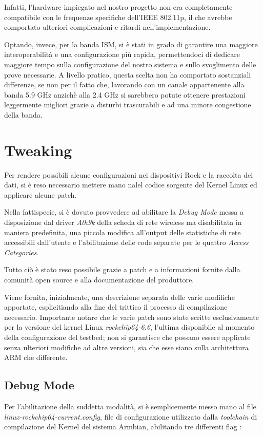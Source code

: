 Infatti, l'hardware impiegato nel nostro progetto non era completamente compatibile con le frequenze specifiche dell'IEEE 802.11p, il che avrebbe comportato ulteriori complicazioni e ritardi nell'implementazione.

Optando, invece, per la banda ISM, si è stati in grado di garantire una maggiore interoperabilità e una configurazione più rapida, permettendoci di dedicare maggiore tempo sulla configurazione del nostro sistema e sullo svoglimento delle prove necessarie. A livello pratico, questa scelta non ha comportato sostanziali differenze, se non per il fatto che, lavorando con un canale appartenente alla banda 5.9 GHz anzichè alla 2.4 GHz si sarebbero potute ottenere prestazioni leggermente migliori grazie a disturbi trascurabili e ad una minore congestione della banda.

\section{Tweaking}
Per rendere possibili alcune configurazioni nei dispositivi Rock e la raccolta dei dati, si è reso necessario mettere mano nalel codice sorgente del Kernel Linux ed applicare alcune patch.

Nella fattispecie, si è dovuto provvedere ad abilitare la \textit{Debug Mode} messa a disposizione dal driver \textit{Ath9k} della scheda di rete wireless ma disabilitata in maniera predefinita, una piccola modifica all'output delle statistiche di rete accessibili dall'utente e l'abilitazione delle code separate per le quattro \textit{Access Categories}.

Tutto ciò è stato reso possibile grazie a patch e a informazioni fornite dalla comunità open source e alla documentazione del produttore.

Viene fornita, inizialmente, una descrizione separata delle varie modifiche apportate, esplicitiando alla fine del trittico il processo di compilazione necessario. Importante notare che le varie patch sono state scritte esclusivamente per la versione del kernel Linux \textit{rockchip64-6.6}, l'ultima disponibile al momento della configurazione del testbed; non si garantisce che possano essere applicate senza ulteriori modifiche ad altre versioni, sia che esse siano sulla architettura ARM che differente.

\subsection[Debug Mode]{Debug Mode}
Per l'abilitazione della suddetta modalità, si è semplicemente messo mano al file \textit{linux-rockchip64-current.config}, file di configurazione utilizzato dalla \textit{toolchain} di compilazione del Kernel del sistema Armbian, abilitando tre differenti flag \cite{linux_wireless}:

